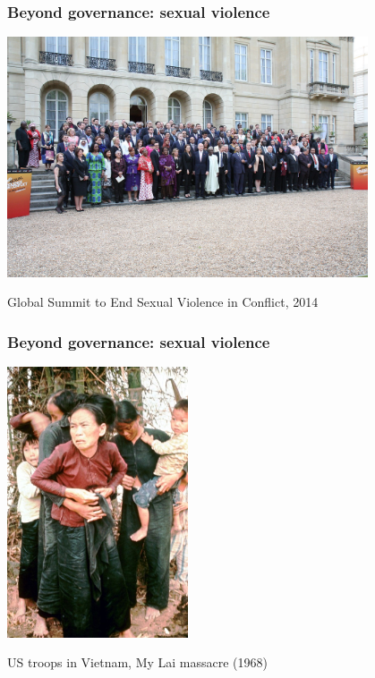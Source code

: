 \documentclass[aspectratio=43]{beamer}
\begin{document}

\begin{frame}
\frametitle{Beyond governance: sexual violence}
\centering

\includegraphics[width = 0.8\textwidth]{img/global_summit_rape}

Global Summit to End Sexual Violence in Conflict, 2014

\end{frame}


\begin{frame}
\frametitle{Beyond governance: sexual violence}
\centering

\includegraphics[width = 0.4\textwidth]{img/my_lai}

US troops in Vietnam, My Lai massacre (1968)

\end{frame}
\end{document}
